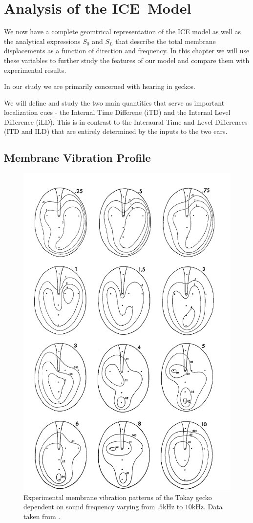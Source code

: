 \chapter{Analysis of the ICE--Model}\label{modelanalysischapter}
We now have a complete geomtrical representation of the ICE model as well as
 the analytical expressions $S_0$ and $S_L$ that describe the total membrane displacements
as a function of direction and frequency. In this chapter we will use these variables
to further study the features of our model and compare them with experimental results.

In our study we are primarily concerned with hearing in geckos.

We will define and study the two main quantities that serve as important localization
cues - the Internal Time Differene (iTD) and the Internal Level Difference (iLD). This
is in contrast to the Interaural Time and Level Differences (ITD and ILD) that are
entirely determined by the inputs to the two ears.
\section{Membrane Vibration Profile}
\begin{figure}[ht!]
 \centering
 \includegraphics[width=.5\linewidth]{Diagrams/manleygeckoear2.png}
 \caption[Tokay gecko tympanum vibration profiles.]{Experimental membrane vibration patterns of the Tokay gecko dependent
 on sound frequency varying from $.5$kHz to $10$kHz. Data taken from \cite{manleygecko1}.}
  \label{manleygeckotympanum}
\end{figure}


